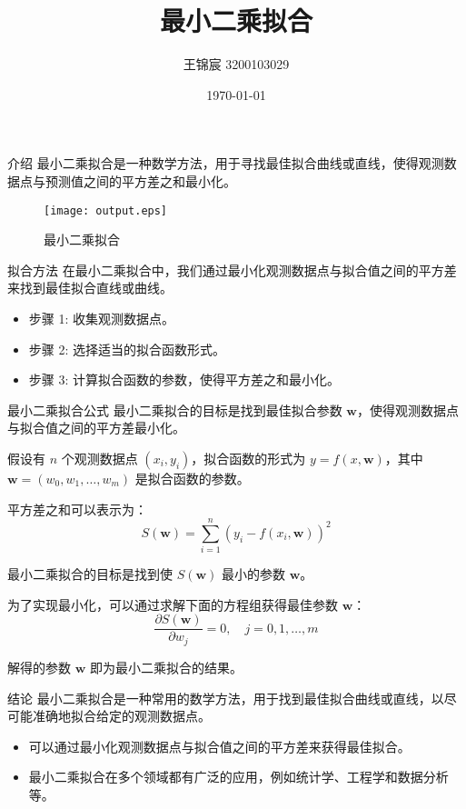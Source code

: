 \documentclass{beamer}
\title{最小二乘拟合}
\author{王锦宸 3200103029}
\date{\today}
\begin{document}
\begin{frame}
  \titlepage
\end{frame}

\begin{frame}{介绍}
  最小二乘拟合是一种数学方法，用于寻找最佳拟合曲线或直线，使得观测数据点与预测值之间的平方差之和最小化。

  \begin{figure}
    \centering
    \texttt{[image: output.eps]}
    \caption{最小二乘拟合}
    \label{fig:fitting}
  \end{figure}
\end{frame}

\begin{frame}{拟合方法}
  在最小二乘拟合中，我们通过最小化观测数据点与拟合值之间的平方差来找到最佳拟合直线或曲线。

  \begin{itemize}
    \item 步骤 1: 收集观测数据点。
    \item 步骤 2: 选择适当的拟合函数形式。
    \item 步骤 3: 计算拟合函数的参数，使得平方差之和最小化。
  \end{itemize}
\end{frame}

\begin{frame}{最小二乘拟合公式}
  最小二乘拟合的目标是找到最佳拟合参数 $\mathbf{w}$，使得观测数据点与拟合值之间的平方差最小化。

  假设有 $n$ 个观测数据点 $(x_i, y_i)$，拟合函数的形式为 $y = f(x, \mathbf{w})$，其中 $\mathbf{w} = (w_0, w_1, \ldots, w_m)$ 是拟合函数的参数。

  平方差之和可以表示为：
  \[
  S(\mathbf{w}) = \sum_{i=1}^{n} (y_i - f(x_i, \mathbf{w}))^2
  \]

  最小二乘拟合的目标是找到使 $S(\mathbf{w})$ 最小的参数 $\mathbf{w}$。

  为了实现最小化，可以通过求解下面的方程组获得最佳参数 $\mathbf{w}$：
  \[
  \frac{\partial S(\mathbf{w})}{\partial w_j} = 0, \quad j = 0, 1, \ldots, m
  \]

  解得的参数 $\mathbf{w}$ 即为最小二乘拟合的结果。
\end{frame}

\begin{frame}{结论}
  最小二乘拟合是一种常用的数学方法，用于找到最佳拟合曲线或直线，以尽可能准确地拟合给定的观测数据点。

  \begin{itemize}
    \item 可以通过最小化观测数据点与拟合值之间的平方差来获得最佳拟合。
    \item 最小二乘拟合在多个领域都有广泛的应用，例如统计学、工程学和数据分析等。
  \end{itemize}
\end{frame}
\end{document}
